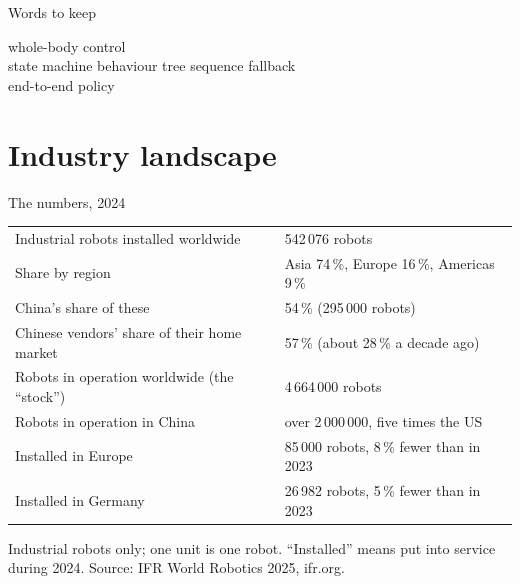 \documentclass[aspectratio=169]{beamer}
\newcommand{\wordsframe}[1]{\begin{frame}{Words to keep}\begin{center}\Large #1\end{center}\end{frame}}
\begin{document}
\wordsframe{whole-body control \\[3mm] state machine \quad behaviour tree \quad sequence \quad fallback \\[3mm] end-to-end \quad policy}

\section{Industry landscape}

\begin{frame}{The numbers, 2024}\small
	\begin{center}
		\begin{tabular}{ll}
			\toprule
			Industrial robots installed worldwide & 542\,076 robots \\
			Share by region & Asia 74\,\%, Europe 16\,\%, Americas 9\,\% \\
			China's share of these & 54\,\% (295\,000 robots) \\
			Chinese vendors' share of their home market & 57\,\% (about 28\,\% a decade ago) \\
			Robots in operation worldwide (the ``stock'') & 4\,664\,000 robots \\
			Robots in operation in China & over 2\,000\,000, five times the US \\
			Installed in Europe & 85\,000 robots, 8\,\% fewer than in 2023 \\
			Installed in Germany & 26\,982 robots, 5\,\% fewer than in 2023 \\
			\bottomrule
		\end{tabular}
	\end{center}
	\vspace{2mm}
	\footnotesize Industrial robots only; one unit is one robot. ``Installed'' means put into service during 2024. Source: IFR World Robotics 2025, ifr.org.
\end{frame}
\end{document}
